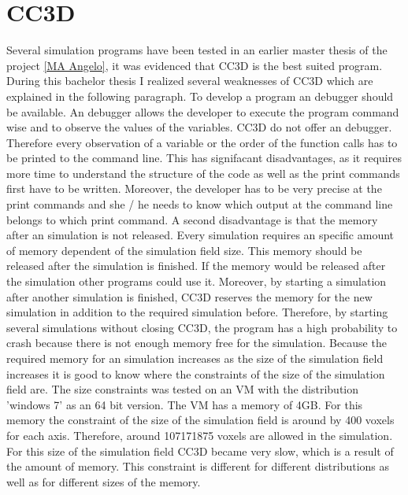 \section{CC3D}
Several simulation programs have been tested in an earlier master thesis of the project \ref{MA Angelo}, it was evidenced that \ac{CC3D} is the best suited program. During this bachelor thesis I realized several weaknesses of \ac{CC3D} which are explained in the following paragraph. \newline
To develop a program an debugger should be available. An debugger allows the developer to execute the program command wise and to observe the values of the variables. \ac{CC3D} do not offer an debugger. Therefore every observation of a variable or the order of the function calls has to be printed to the command line. This has signifacant disadvantages, as it requires more time to understand the structure of the code as well as the print commands first have to be written. Moreover, the developer has to be very precise at the print commands and she / he needs to know which output at the command line belongs to which print command. \newline
A second disadvantage is that the memory after an simulation is not released. Every simulation requires an specific amount of memory dependent of the simulation field size. This memory should be released after the simulation is finished. If the memory would be released after the simulation other programs could use it. Moreover, by starting a simulation after another simulation is finished, \ac{CC3D} reserves the memory for the new simulation in addition to the required simulation before. Therefore, by starting several simulations without closing \ac{CC3D}, the program has a high probability to crash because there is not enough memory free for the simulation. \newline
Because the required memory for an simulation increases as the size of the simulation field increases it is good to know where the constraints of the size of the simulation field are. The size constraints was tested on an \ac{VM} with the distribution 'windows 7' as an 64 bit version. The \ac{VM} has a memory of 4GB. For this memory the constraint of the size of the simulation field is around by 400 voxels for each axis. Therefore, around 107171875 voxels are allowed in the simulation. For this size of the simulation field \ac{CC3D} became very slow, which is a result of the amount of memory. This constraint is different for different distributions as well as for different sizes of the memory. 

